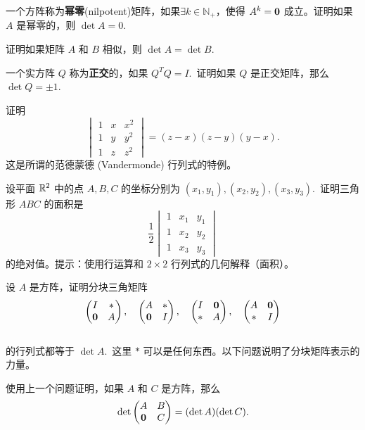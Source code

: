 \begin{problemset}
\item \label{ex:03-03-05} 一个方阵称为\textbf{幂零}(nilpotent)矩阵，如果$\exists k \in \mathbb{N}_+$，使得  $A^k = \mathbf{0}$ 成立。证明如果 $A$ 是幂零的，则 $\det A = 0$.~
\item \label{ex:03-03-06} 证明如果矩阵 $A$ 和 $B$ 相似，则 $\det A = \det B$.~
\item \label{ex:03-03-07} 一个实方阵 $Q$ 称为\textbf{正交}的，如果 $Q^T Q = I$.~证明如果 $Q$ 是正交矩阵，那么 $\det Q = \pm 1$.~
\item \label{ex:03-03-08} 证明
$$\begin{vmatrix} 1 & x & x^2 \\ 1 & y & y^2 \\ 1 & z & z^2 \end{vmatrix} = (z-x)(z-y)(y-x).$$
这是所谓的范德蒙德 (Vandermonde) 行列式的特例。
\item \label{ex:03-03-09} 设平面 $\mathbb{R}^2$ 中的点 $A, B, C$ 的坐标分别为 $(x_1, y_1), (x_2, y_2), (x_3, y_3)$.~证明三角形 $ABC$ 的面积是
$$\frac{1}{2}  \begin{vmatrix} 1 & x_1 & y_1 \\ 1 & x_2 & y_2 \\ 1 & x_3 & y_3 \end{vmatrix} $$
的绝对值。{\heiti 提示}：使用行运算和 $2 \times 2$ 行列式的几何解释（面积）。
\item \label{ex:03-03-10} 设 $A$ 是方阵，证明分块三角矩阵
$$\begin{pmatrix} I & * \\ \mathbf{0} & A \end{pmatrix},\quad \begin{pmatrix} A & * \\ \mathbf{0} & I \end{pmatrix},\quad \begin{pmatrix} I & \mathbf{0} \\ * & A \end{pmatrix},\quad \begin{pmatrix} A & \mathbf{0} \\ * & I \end{pmatrix}$$
\\的行列式都等于 $\det A$.~这里 $*$ 可以是任何东西。以下问题说明了分块矩阵表示的力量。
\item \label{ex:03-03-11} 使用上一个问题证明，如果 $A$ 和 $C$ 是方阵，那么
$$\det \begin{pmatrix} A & B \\ \mathbf{0} & C \end{pmatrix} = (\det A)(\det C).$$

\end{problemset}
